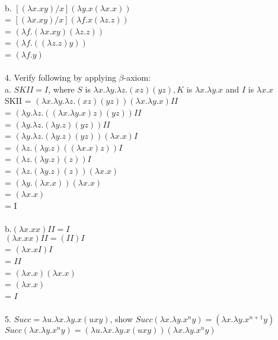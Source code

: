 \documentclass[12pt]{article}
\begin{document}
\vspace{1mm}\\
b. $[(\lambda x.xy)/x](\lambda y.x(\lambda x.x))$\\
= $[(\lambda x.xy)/x](\lambda f.x(\lambda z.z))$\\
= $(\lambda f.(\lambda x.xy)(\lambda z.z))$\\
= $(\lambda f.((\lambda z.z)y))$\\
= $(\lambda f.y)$\\
\vspace{1mm}\\
4. Verify following by applying $\beta$-axiom:\\
a. $SKII = I$, where $S$ is $\lambda x.\lambda y.\lambda z.(xz)(yz), K$ is $\lambda x.\lambda y.x$ and $I$ is $\lambda x.x$\\
SKII = $(\lambda x.\lambda y.\lambda z.(xz)(yz))(\lambda x.\lambda y.x)II$\\
= $(\lambda y.\lambda z.((\lambda x.\lambda y.x)z)(yz))II$\\
= $(\lambda y.\lambda z.(\lambda y.z)(yz))II$\\
= $(\lambda y.\lambda z.(\lambda y.z)(yz))(\lambda x.x)I$\\
= $(\lambda z.(\lambda y.z)((\lambda x.x)z))I$\\
= $(\lambda z.(\lambda y.z)(z))I$\\
= $(\lambda z.(\lambda y.z)(z))(\lambda x.x)$\\
= $(\lambda y.(\lambda x.x))(\lambda x.x)$\\
= $(\lambda x.x)$\\
= I\\
\vspace{1mm}\\
b.$(\lambda x.xx)II = I$\\
$(\lambda x.xx)II = (II)I$\\
= $(\lambda x.xI)I$\\
= $II$\\
= $(\lambda x.x)(\lambda x.x)$\\
= $(\lambda x.x)$\\
= $I$\\
\vspace{1mm}\\
5. $Succ = \lambda u.\lambda x.\lambda y.x(uxy)$, show $Succ(\lambda x.\lambda y.x^{n}y) = (\lambda x.\lambda y. x^{n+1}y)$\\
$Succ(\lambda x.\lambda y.x^{n}y) = (\lambda u.\lambda x.\lambda y.x(uxy))(\lambda x.\lambda y.x^{n}y)$\\
\end{document}
